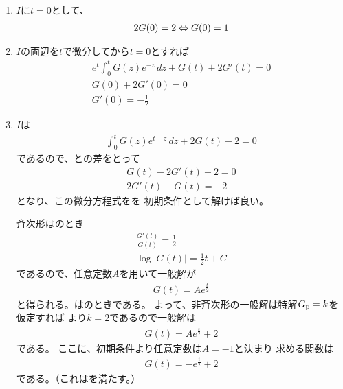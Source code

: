 \begin{ans*}
  ${}$
  \begin{enumerate}[label=(\alph*)]
    \item $I$に$t=0$として、
    \begin{align}
      2G(0) = 2 \eqa G(0) = 1
    \end{align}
    \item $I$の両辺を$t$で微分してから$t=0$とすれば
    \begin{gather}
      e^t\int_{0}^{t}G(z)e^{-z}\,dz + G(t) + 2G'(t) = 0 \label{eq:2020_autumn_diffintG}\\
      G(0) + 2G'(0) = 0 \\
      G'(0) = -\frac{1}{2}
    \end{gather}
    \item $I$は
    \begin{gather}
      \int_{0}^{t} G(z)e^{t-z}\,dz + 2G(t) - 2 = 0 \label{eq:2020_autumn_intG}
    \end{gather}
    であるので、との差をとって
    \begin{gather}
      G(t) - 2G'(t) - 2 = 0 \\
      2G'(t) - G(t) = -2 \label{eq:2020_autumn_GODE}
    \end{gather}
    となり、この微分方程式をを
    初期条件として解けば良い。

    斉次形はのとき
    \begin{gather}
      \frac{G'(t)}{G(t)} = \frac{1}{2} \\
      \log |G(t)| = \frac{1}{2}t + C
    \end{gather}
    であるので、任意定数$A$を用いて一般解が
    \begin{gather}
      G(t) = Ae^\frac{t}{2}
    \end{gather}
    と得られる。はのときである。
    よって、非斉次形の一般解は特解$G_{\rm{p}}=k$を仮定すれば
    より$k=2$であるので一般解は
    \begin{gather}
      G(t) = Ae^\frac{t}{2} + 2
    \end{gather}
    である。
    ここに、初期条件より任意定数は$A=-1$と決まり
    求める関数は
    \begin{gather}
      G(t) = -e^{\frac{t}{2}} + 2
    \end{gather}
    である。（これはを満たす。）
  \end{enumerate}
\end{ans*}

